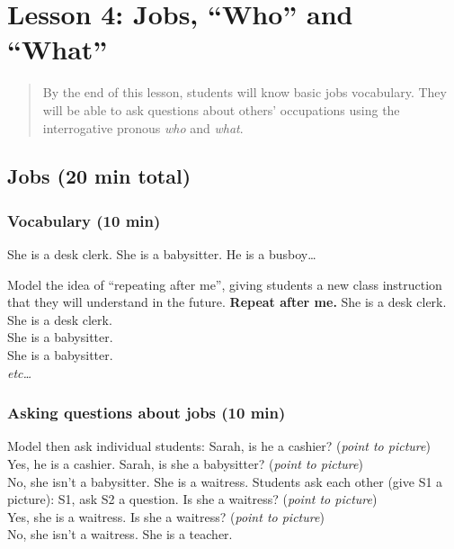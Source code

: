 \chapter{Lesson 4: Jobs, ``Who'' and ``What''}

\begin{abstract}
\noindent By the end of this lesson, students will know basic jobs vocabulary. They will be able to ask questions about others' occupations using the interrogative pronous \emph{who} and \emph{what}.
\end{abstract}

\section{Jobs (20 min total)}
\subsection{Vocabulary (10 min)}
\begin{framed}
\dialt She is a desk clerk. She is a babysitter. He is a busboy\ldots
\end{framed}

Model the idea of ``repeating after me'', giving students a new class instruction that they will understand in the future.
\ex
\dialt \textbf{Repeat after me.} She is a desk clerk.\\
\dials She is a desk clerk.\\
\dialt She is a babysitter.\\
\dials She is a babysitter.\\
\emph{etc\ldots}
\xe

\subsection{Asking questions about jobs (10 min)}
Model then ask individual students:
\ex
\dialt Sarah, is he a cashier? (\emph{point to picture})\\
\dials Yes, he is a cashier.
\xe
\ex
\dialt Sarah, is she a babysitter? (\emph{point to picture})\\
\dials No, she isn't a babysitter. She is a waitress.
\xe
Students ask each other (give S1 a picture):
\pex
\dialt S1, ask S2 a question.
\a \dialsone Is she a waitress? (\emph{point to picture})\\
\dialstwo Yes, she is a waitress.
\a \dialsone Is she a waitress? (\emph{point to picture})\\
\dialstwo No, she isn't a waitress. She is a teacher.
\xe

